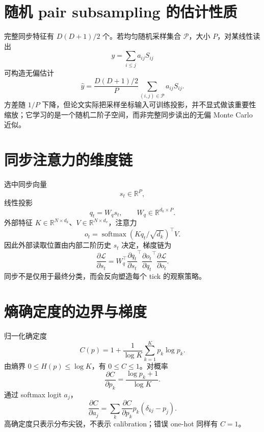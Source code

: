 \documentclass[UTF8,12pt,a4paper,fontset=none]{ctexart}
\numberwithin{equation}{section}
\newcommand{\R}{\mathbb{R}}
\newcommand{\Loss}{\mathcal{L}}
\newcommand{\softmax}{\operatorname{softmax}}
\begin{document}
\section{随机 pair subsampling 的估计性质}
完整同步特征有 $D(D+1)/2$ 个。若均匀随机采样集合 $\mathcal P$，大小 $P$，对某线性读出
\begin{equation}
 y=\sum_{i\le j}a_{ij}S_{ij}
\end{equation}
可构造无偏估计
\begin{equation}
 \widehat y=\frac{D(D+1)/2}{P}
 \sum_{(i,j)\in\mathcal P}a_{ij}S_{ij}.
\end{equation}
方差随 $1/P$ 下降，但论文实际把采样坐标输入可训练投影，并不显式做该重要性缩放；它学习的是一个随机二阶子空间，而非完整同步读出的无偏 Monte Carlo 近似。

\section{同步注意力的维度链}
选中同步向量
\begin{equation}
 s_t\in\R^P,
\end{equation}
线性投影
\begin{equation}
 q_t=W_qs_t,
 \qquad W_q\in\R^{d_k\times P}.
\end{equation}
外部特征 $K\in\R^{N\times d_k}$、$V\in\R^{N\times d_v}$，注意力
\begin{equation}
 o_t=\softmax(Kq_t/\sqrt{d_k})^\top V.
\end{equation}
因此外部读取位置由内部二阶历史 $s_t$ 决定，梯度链为
\begin{equation}
 \frac{\partial\Loss}{\partial s_t}
 =W_q^\top
 \frac{\partial q_t}{\partial s_t}^\top
 \frac{\partial o_t}{\partial q_t}^\top
 \frac{\partial\Loss}{\partial o_t}.
\end{equation}
同步不是仅用于最终分类，而会反向塑造每个 tick 的观察策略。

\section{熵确定度的边界与梯度}
归一化确定度
\begin{equation}
 C(p)=1+\frac1{\log K}\sum_{k=1}^{K}p_k\log p_k.
\end{equation}
由熵界 $0\le H(p)\le\log K$，有 $0\le C\le1$。对概率
\begin{equation}
 \frac{\partial C}{\partial p_k}
 =\frac{\log p_k+1}{\log K}.
\end{equation}
通过 softmax logit $a_j$，
\begin{equation}
 \frac{\partial C}{\partial a_j}
 =\sum_k\frac{\partial C}{\partial p_k}p_k(\delta_{kj}-p_j).
\end{equation}
高确定度只表示分布尖锐，不表示 calibration；错误 one-hot 同样有 $C=1$。
\end{document}
